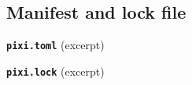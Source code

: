 \documentclass[paper44x36in,fleqn]{betterposter}
\begin{document}
{ \subsection{Manifest and lock file}
 \textbf{\texttt{pixi.toml}} (excerpt)
 
 \vspace{0.25em}
 \textbf{\texttt{pixi.lock}} (excerpt)\par
 \nointerlineskip\vspace{\medskipamount}
 \noindent
 \begin{minipage}[t]{0.37\textwidth}
  \vspace{0pt}
  \setlength{\fboxsep}{8pt}%
  \colorbox{black!4}{\begin{minipage}[t]{\dimexpr\linewidth-2\fboxsep\relax}
   
  \end{minipage}}
 \end{minipage}%
 \hfill
 \begin{minipage}[t]{0.61\textwidth}
  \vspace{0pt}
  \setlength{\fboxsep}{8pt}%
  \colorbox{black!4}{\begin{minipage}[t]{\dimexpr\linewidth-2\fboxsep\relax}
    

\end{minipage}}
\end{minipage}}
\end{document}
